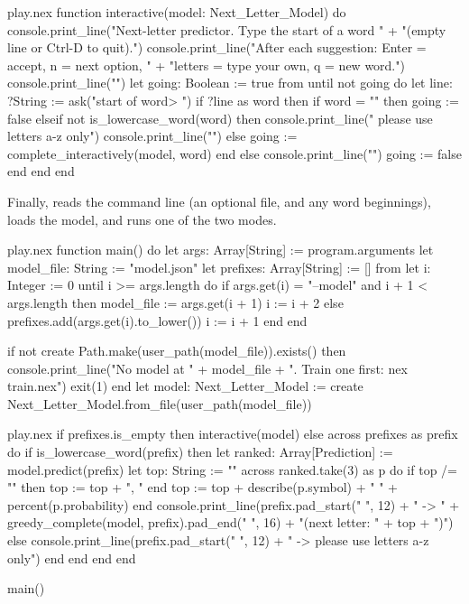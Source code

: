 \documentclass[11pt,a4paper,oneside,openany]{book}
\newcommand{\code}[1]{\texttt{\detokenize{#1}}}
\begin{document}
\begin{append}{play.nex}
function interactive(model: Next_Letter_Model) do
  console.print_line("Next-letter predictor. Type the start of a word "
    + "(empty line or Ctrl-D to quit).")
  console.print_line("After each suggestion: Enter = accept, n = next option, "
    + "letters = type your own, q = new word.")
  console.print_line("")
  let going: Boolean := true
  from
  until
    not going
  do
    let line: ?String := ask("start of word> ")
    if ?line as word then
      if word = "" then
        going := false
      elseif not is_lowercase_word(word) then
        console.print_line("  please use letters a-z only")
        console.print_line("")
      else
        going := complete_interactively(model, word)
      end
    else
      console.print_line("")
      going := false
    end
  end
end
\end{append}

Finally, \code{main} reads the command line (an optional
\code{--model} file, and any word beginnings), loads the model, and runs
one of the two modes.

\begin{append}{play.nex}
function main() do
  let args: Array[String] := program.arguments
  let model_file: String := "model.json"
  let prefixes: Array[String] := []
  from
    let i: Integer := 0
  until
    i >= args.length
  do
    if args.get(i) = "--model" and i + 1 < args.length then
      model_file := args.get(i + 1)
      i := i + 2
    else
      prefixes.add(args.get(i).to_lower())
      i := i + 1
    end
  end

  if not create Path.make(user_path(model_file)).exists() then
    console.print_line("No model at " + model_file + ". Train one first: nex train.nex")
    exit(1)
  end
  let model: Next_Letter_Model :=
    create Next_Letter_Model.from_file(user_path(model_file))
\end{append}

\begin{continued}{play.nex}
  if prefixes.is_empty then
    interactive(model)
  else
    across prefixes as prefix do
      if is_lowercase_word(prefix) then
        let ranked: Array[Prediction] := model.predict(prefix)
        let top: String := ""
        across ranked.take(3) as p do
          if top /= "" then
            top := top + ", "
          end
          top := top + describe(p.symbol) + " " + percent(p.probability)
        end
        console.print_line(prefix.pad_start(" ", 12) + " -> "
          + greedy_complete(model, prefix).pad_end(" ", 16) + "(next letter: " + top + ")")
      else
        console.print_line(prefix.pad_start(" ", 12) + " -> please use letters a-z only")
      end
    end
  end
end

main()
\end{continued}
\end{document}
